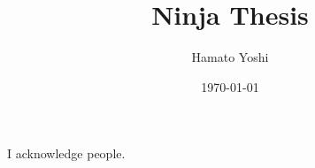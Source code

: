 \usepackage[style=alphabetic,natbib=true]{biblatex}
\usepackage{lipsum}



\title{Ninja Thesis}
\author{Hamato Yoshi}

\date{\today}

\address{%
First Line\\
Second Line\\
Third Line\\
\url{http://www.somewhere.com}
}






\maketitle
\frontmatter
\thispagestyle{empty}
\begin{abstract}

\end{abstract}
\cleardoublepage


\makeDeclaration{}
\makePermission{}


\begin{acknowledgements}
I acknowledge people.
\end{acknowledgements}
\tableofcontents

